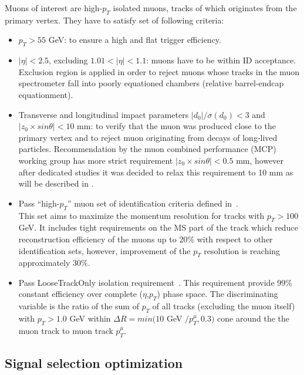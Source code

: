 Muons of interest are high-$p_T$ isolated muons, tracks of which originates
from the primary vertex. They have to satisfy set of following criteria:
\begin{itemize}
 \item $p_T > 55$ GeV: to ensure a high and flat trigger efficiency.
 \item $|\eta|<2.5$, excluding $1.01 < |\eta| < 1.1$: muons have to be within ID acceptance. 
 Exclusion region is applied in order to reject muons whose tracks in the muon spectrometer fall into poorly equationed chambers (relative barrel-endcap equationment).
 \item Transverse and longitudinal impact parameters $|d_0|/\sigma(d_0) < 3$ and $|z_0 \times sin \theta| < 10$ mm: 
 to verify that the muon was produced close to the primary vertex and to reject muon originating from decays of long-lived particles. Recommendation by the muon combined performance (MCP) working group has
 more strict requirement $|z_0 \times sin \theta| < 0.5$ mm, however after dedicated studies it 
 was decided to relax this requirement to 10 mm as will be described in .
  \item Pass ``high-$p_T$'' muon set of identification criteria defined in~\cite{muon_performance_2015}. \\ 
 This set aims to maximize the momentum resolution for tracks with $p_T > 100$ GeV.
 It includes tight requirements on the MS part of the track which reduce reconstruction
 efficiency of the muons up to 20$\%$ with respect to other identification sets, however, 
 improvement of the $p_T$ resolution is reaching approximately 30$\%$.
 \item Pass LooseTrackOnly isolation requirement~\cite{muon_performance_2015}. 
 This requirement provide 99$\%$ constant efficiency over complete ($\eta$,$p_T$) phase space.
 The discriminating variable is the ratio of the sum of $p_T$ of all tracks (excluding the muon itself) with $p_T > 1.0$ GeV within  $\Delta R = min(10$ GeV $/p_T^{\mu}, 0.3)$ 
 cone around the the muon track to muon track $p_T^{\mu}$.
\end{itemize}  
 
\subsection{Signal selection optimization}
\label{subsec:wprime_cut_optimization}

